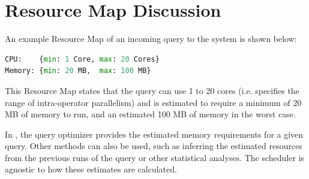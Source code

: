 %

\section{Resource Map Discussion}\label{apx:resource-map}
An example Resource Map of an incoming query to the system is shown below:
\begin{lstlisting}[language=python, 
								   basicstyle=\ttfamily\small, 
								   showstringspaces=false,
								   keywordstyle=\color{bondiblue}\bfseries, 
								   emph={CPU, Memory}, 
								   emphstyle=\color{cardinal}\bfseries]
CPU:    {min: 1 Core, max: 20 Cores}
Memory: {min: 20 MB,  max: 100 MB}
\end{lstlisting}

This Resource Map states that the query can use 1 to 20 cores (i.e. specifies the range of intra-operator parallelism) and is estimated to require a minimum of 20 MB of memory to run, and an estimated 100 MB of memory in the worst case.

In \sys{}, the query optimizer provides the estimated memory requirements for a given query.
Other methods can also be used, such as inferring the estimated resources from the previous runs of the query or other statistical analyses.
The scheduler is agnostic to how these estimates are calculated.

